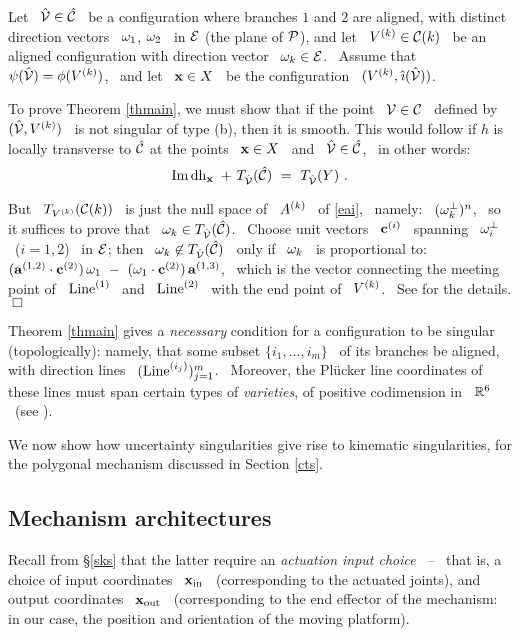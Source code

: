 Let \ $\hat{\mathcal{V}}\in\hat{\mathcal{C}}$ \ be a configuration where branches $1$ and $2$
are aligned, with distinct direction vectors \ $\mathbf{\omega}_{1}$, $\mathbf{\omega}_{2}$ \ in $\mathcal{E}$
(the plane of $\mathcal{P}$), and let \ $V\sp{({k})}\in\mathcal{C}(k)$ \ be an aligned
configuration with direction vector \ $\mathbf{\omega}_{k}\in\mathcal{E}$. \ Assume that \
$\psi(\hat{\mathcal{V}})=\phi(V\sp{({k})})$, \ and let \ $\mathbf{x}\in X$ \ be the
configuration \ $(\Vj{k},\hi(\hV))$.

To prove Theorem \ref{thmain}, we must show that if the point \
$\mathcal{V}\in\mathcal{C}$ \ defined by \ $(\hat{\mathcal{V}},V\sp{({k})})$ \ is not singular of type
(b), then it is smooth. This would follow if $h$ is
locally transverse to $\hat{\mathcal{C}}$ at the points \ $\mathbf{x}\in X$ \ and \
$\hat{\mathcal{V}}\in\hat{\mathcal{C}}$, \ in other words:
%
\begin{equation}\label{etransv}
%
\Image\dhh_{\bx}~+~T_{\hV}(\hC)~=~T_{\hV}(Y)~.
%
\end{equation}

But \ $T_{V\sp{({k})}}(\mathcal{C}(k))$ \ is just the null space of \
$A\sp{({k})}$ \ of \eqref{eai}, \ namely: \ $(\mathbf{\omega}_{k}^{\perp})^{n}$, \
so it suffices to prove that \ $\mathbf{\omega}_{k}\in T_{\hat{\mathcal{V}}}(\hat{\mathcal{C}})$. \
Choose unit vectors \ $\mathbf{c}\sp{({i})}$ \ spanning \ $\mathbf{\omega}_{i}^{\perp}$ \
($i=1,2$) \ in $\mathcal{E}$; then \ $\mathbf{\omega}_{k}\not\in T_{\hat{\mathcal{V}}}(\hat{\mathcal{C}})$ \
only if \ $\mathbf{\omega}_{k}$ \ is proportional to: \
$(\mathbf{a}\sp{({1,2})}\cdot\mathbf{c}\sp{({2})})\,\mathbf{\omega}_{1}~-~(\mathbf{\omega}_{1}\cdot\mathbf{c}\sp{({2})})\,\mathbf{a}\sp{({1,3})}$, \
which is the vector connecting the meeting point of \
$\operatorname{Line}\sp{({1})}$ \ and \ $\operatorname{Line}\sp{({2})}$ \ with the end point
of \ $V\sp{({k})}$. \ See \cite{SSB2} for the details.\hfill$\Box$

%
%
\sect{Kinematic singularities} \label{crks}

Theorem \ref{thmain} gives a \emph{necessary} condition for a
configuration to be singular (topologically): namely, that some
subset $\{i_{1},\dotsc,i_{m}\}$ \ of its branches be aligned, with
direction lines \ $(\operatorname{Line}\sp{({i_{j}})})_{j=1}^{m}$. \ Moreover, the
Pl\"{u}cker line coordinates of these lines must span certain
types of \emph{varieties}, of positive codimension in \ $\mathbb{R}^{6}$
\ (see \cite[\S 5]{M}).

We now show how uncertainty singularities give rise to kinematic
singularities, for the polygonal mechanism discussed in Section \ref{cts}.

\subsection{Mechanism architectures}
\label{sarch}

Recall from \S \ref{sks} that the latter require an
\emph{actuation input choice} \ -- \ that is, a choice of input
coordinates \ $\mathbf{x}_{\operatorname{in}}$ \ (corresponding to the actuated
joints), and output coordinates  \ $\mathbf{x}_{\operatorname{out}}$ \ (corresponding
to the end effector of the mechanism: in our case, the position
and orientation of the moving platform).

